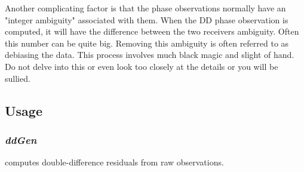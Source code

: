 Another complicating factor is that the phase observations normally
have an "integer ambiguity" associated with them. When the DD phase
observation is computed, it will have the difference between the two
receivers ambiguity. Often this number can be quite big. Removing this
ambiguity is often referred to as debiasing the data. This process
involves much black magic and slight of hand. Do not delve into this
or even look too closely at the details or you will be sullied.

\subsection{Usage}
\subsubsection{\emph{ddGen}}
 computes double-difference residuals from raw observations.
